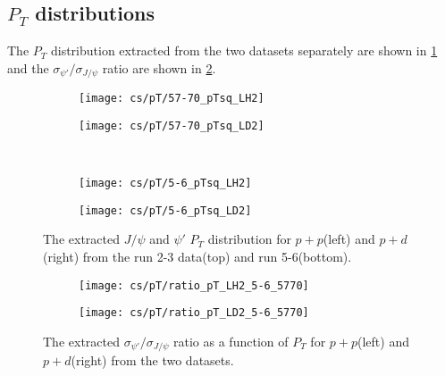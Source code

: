 \documentclass[../main.tex]{subfiles}
\begin{document}
\subsection{$P_T$ distributions}
The $P_T$ distribution extracted from the two datasets separately are shown in \cref{fig:pT_distribution}
and the $\sigma_{\psi'}/\sigma_{J/\psi}$ ratio are shown in \cref{fig:pT_ratio}.
\begin{figure}[h!]
	\centering
	\begin{subfigure}{0.45\linewidth}
		\texttt{[image: cs/pT/57-70\_pTsq\_LH2]}
	\end{subfigure}
	\begin{subfigure}{0.45\linewidth}
		\texttt{[image: cs/pT/57-70\_pTsq\_LD2]}
	\end{subfigure}
	\\
	\begin{subfigure}{0.45\linewidth}
		\texttt{[image: cs/pT/5-6\_pTsq\_LH2]}
	\end{subfigure}
	\begin{subfigure}{0.45\linewidth}
		\texttt{[image: cs/pT/5-6\_pTsq\_LD2]}
	\end{subfigure}
	\caption{The extracted $J/\psi$ and $\psi'$ $P_T$ distribution for $p+p$(left)
		and $p+d$(right) from the run 2-3 data(top) and run 5-6(bottom).}
	\label{fig:pT_distribution}
\end{figure}
\begin{figure}[h!]
	\centering
	\begin{subfigure}{0.45\linewidth}
		\texttt{[image: cs/pT/ratio\_pT\_LH2\_5-6\_5770]}
	\end{subfigure}
	\begin{subfigure}{0.45\linewidth}
		\texttt{[image: cs/pT/ratio\_pT\_LD2\_5-6\_5770]}
	\end{subfigure}
	\caption{The extracted  $\sigma_{\psi'}/\sigma_{J/\psi}$ ratio as a function of $P_T$ for $p+p$(left)
		and $p+d$(right) from the two datasets.}
	\label{fig:pT_ratio}
\end{figure}
\begin{table}[h!]
	\centering
	\caption{Cross section $d\sigma/dp^2_T$ (in \unit{\nano\barn\GeV^{-2} nucleon^{-1}}) and the
		$\sigma_{\psi'}/\sigma_{J/\psi}$ ratio for $p+p$ extracted from the run 2-3, with
		their statistical and systematic uncertainties and the $\expval{p_T}$ (in \unit{\GeV})in each bin.}
	
\end{table}
\end{document}
